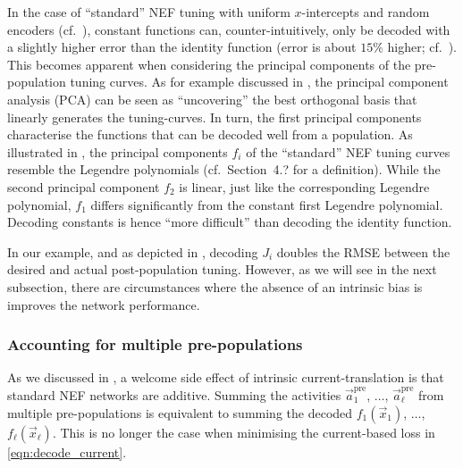 In the case of \enquote{standard} NEF tuning with uniform $x$-intercepts and random encoders (cf.~), constant functions can, counter-intuitively, only be decoded with a slightly higher error than the identity function (error is about $15\%$ higher; cf.~).
This becomes apparent when considering the principal components of the pre-population tuning curves.
As for example discussed in \citet[Chapter~7]{eliasmith2003neural}, the principal component analysis (PCA) can be seen as \enquote{uncovering} the best orthogonal basis that linearly generates the tuning-curves.
In turn, the first principal components characterise the functions that can be decoded well from a population.
As illustrated in , the principal components $f_i$ of the \enquote{standard} NEF tuning curves resemble the Legendre polynomials (cf.~Section~4.? for a definition).
While the second principal component $f_2$ is linear, just like the corresponding Legendre polynomial, $f_1$ differs significantly from the constant first Legendre polynomial.
Decoding constants is hence \enquote{more difficult} than decoding the identity function.

In our example, and as depicted in , decoding $J_i$ doubles the RMSE between the desired and actual post-population tuning.
However, as we will see in the next subsection, there are circumstances where the absence of an intrinsic bias is improves the network performance.

\subsubsection{Accounting for multiple pre-populations}
As we discussed in , a welcome side effect of intrinsic current-translation is that standard NEF networks are additive.
Summing the activities $\vec a^\mathrm{pre}_1$, $\ldots$, $\vec a^\mathrm{pre}_\ell$ from multiple pre-populations is equivalent to summing the decoded $f_1(\vec x_1)$, $\ldots$, $f_\ell(\vec x_\ell)$.
This is no longer the case when
minimising the current-based loss in \cref{eqn:decode_current}.

